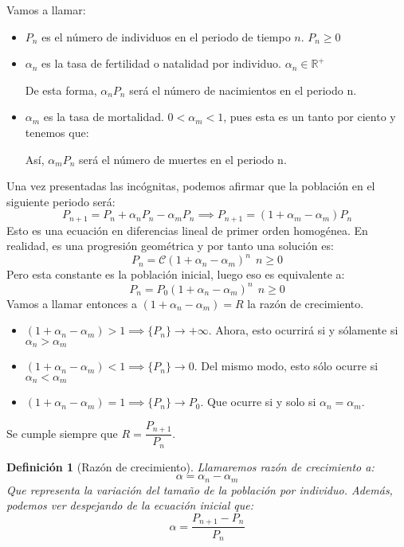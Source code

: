 \documentclass[11pt, a4paper]{article}
\newif\IfInSansMode
\numberwithin{equation}{section}
\newcommand{\R}{\mathbb{R}}
\theoremstyle{theorem-style}
\theoremstyle{definition-style}
\newtheorem{ndef}{Definición}[section]
\theoremstyle{remark-style}
\theoremstyle{example-style}
\begin{document}
Vamos a llamar:
\begin{itemize}
	\item $P_n$ es el número de individuos en el periodo de tiempo $n$. $P_n\geq 0 $
	\item $\alpha_n$ es la tasa de fertilidad o natalidad por individuo. $\alpha_n \in \R^+$
	
	De esta forma, $\alpha_n P_n$ será el número de nacimientos en el periodo n.
	\item $\alpha_m$ es la tasa de mortalidad. $0 < \alpha_m < 1$, pues esta es un tanto por ciento y tenemos que:
	
	Así, $\alpha_m P_n$ será el número de muertes en el periodo n.
\end{itemize}

Una vez presentadas las incógnitas, podemos afirmar que la población en el siguiente periodo será:
\[
P_{n+1} = P_n + \alpha_n P_n - \alpha_m P_n \implies P_{n+1}=(1+\alpha_m-\alpha_m)P_n
\]
Esto es una ecuación en diferencias lineal de primer orden homogénea. En realidad, es una progresión geométrica y por tanto una solución es:
\[
P_n =\mathcal{C} (1+\alpha_n-\alpha_m)^n \ \ n \geq 0
\]
Pero esta constante es la población inicial, luego eso es equivalente a:
\[
P_n =P_0 (1+\alpha_n-\alpha_m)^n \ \ n \geq 0
\]
Vamos a llamar entonces a $(1+\alpha_n-\alpha_m) = R$ la razón de crecimiento.
\begin{itemize}
	\item $(1+\alpha_n-\alpha_m) > 1 \implies \{P_n\}\to +\infty$. Ahora, esto ocurrirá si y sólamente si $\alpha_n > \alpha_m$
	
	\item $(1+\alpha_n-\alpha_m) < 1 \implies \{P_n\}\to 0$. Del mismo modo, esto sólo ocurre si $\alpha_n < \alpha_m$
	
	\item $(1+\alpha_n-\alpha_m) = 1 \implies \{P_n\} \to P_0$. Que ocurre si y solo si $\alpha_n = \alpha_m$.
\end{itemize}

Se cumple siempre que $R = \dfrac{P_{n+1}}{P_n}$.

\begin{ndef}[Razón de crecimiento]
	Llamaremos razón de crecimiento a:
	\[
	\alpha = \alpha_n - \alpha_m
	\]
	Que representa la variación del tamaño de la población por individuo. Además, podemos ver despejando de la ecuación inicial que:
	\[
	\alpha = \dfrac{P_{n+1}-P_n}{P_n}
	\]
	
\end{ndef}
\end{document}
